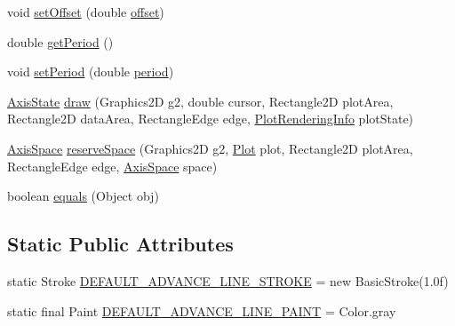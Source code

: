 \begin{DoxyCompactItemize}
\item 
void \mbox{\hyperlink{classorg_1_1jfree_1_1chart_1_1axis_1_1_cyclic_number_axis_acd1116d5cc3c056b40c87acbbd40b7a1}{set\+Offset}} (double \mbox{\hyperlink{classorg_1_1jfree_1_1chart_1_1axis_1_1_cyclic_number_axis_a6e933c67b716e70d85f4438740fce7b1}{offset}})
\item 
double \mbox{\hyperlink{classorg_1_1jfree_1_1chart_1_1axis_1_1_cyclic_number_axis_a4cc6bdc62a9824b3fcf2b501b2d44387}{get\+Period}} ()
\item 
void \mbox{\hyperlink{classorg_1_1jfree_1_1chart_1_1axis_1_1_cyclic_number_axis_abe4d20b864e5abc7d32c952c74c8721f}{set\+Period}} (double \mbox{\hyperlink{classorg_1_1jfree_1_1chart_1_1axis_1_1_cyclic_number_axis_a3c65906e3e4963a1cf1f9ade9237ea7c}{period}})
\item 
\mbox{\hyperlink{classorg_1_1jfree_1_1chart_1_1axis_1_1_axis_state}{Axis\+State}} \mbox{\hyperlink{classorg_1_1jfree_1_1chart_1_1axis_1_1_cyclic_number_axis_ad760bc36b2877cd2aab98f6ad3d10787}{draw}} (Graphics2D g2, double cursor, Rectangle2D plot\+Area, Rectangle2D data\+Area, Rectangle\+Edge edge, \mbox{\hyperlink{classorg_1_1jfree_1_1chart_1_1plot_1_1_plot_rendering_info}{Plot\+Rendering\+Info}} plot\+State)
\item 
\mbox{\hyperlink{classorg_1_1jfree_1_1chart_1_1axis_1_1_axis_space}{Axis\+Space}} \mbox{\hyperlink{classorg_1_1jfree_1_1chart_1_1axis_1_1_cyclic_number_axis_a8b85ca11c57d40492d7c0ae1c51e0c76}{reserve\+Space}} (Graphics2D g2, \mbox{\hyperlink{classorg_1_1jfree_1_1chart_1_1plot_1_1_plot}{Plot}} plot, Rectangle2D plot\+Area, Rectangle\+Edge edge, \mbox{\hyperlink{classorg_1_1jfree_1_1chart_1_1axis_1_1_axis_space}{Axis\+Space}} space)
\item 
boolean \mbox{\hyperlink{classorg_1_1jfree_1_1chart_1_1axis_1_1_cyclic_number_axis_a5310c33c4321ac7310cb12303ff7a8dc}{equals}} (Object obj)
\end{DoxyCompactItemize}
\subsection*{Static Public Attributes}
\begin{DoxyCompactItemize}
\item 
static Stroke \mbox{\hyperlink{classorg_1_1jfree_1_1chart_1_1axis_1_1_cyclic_number_axis_a5bc1187c8b3cd763e28f2cb6f9f09716}{D\+E\+F\+A\+U\+L\+T\+\_\+\+A\+D\+V\+A\+N\+C\+E\+\_\+\+L\+I\+N\+E\+\_\+\+S\+T\+R\+O\+KE}} = new Basic\+Stroke(1.\+0f)
\item 
static final Paint \mbox{\hyperlink{classorg_1_1jfree_1_1chart_1_1axis_1_1_cyclic_number_axis_a128bcb68b4ddcf142e0a3db0aa584849}{D\+E\+F\+A\+U\+L\+T\+\_\+\+A\+D\+V\+A\+N\+C\+E\+\_\+\+L\+I\+N\+E\+\_\+\+P\+A\+I\+NT}} = Color.\+gray
\end{DoxyCompactItemize}
